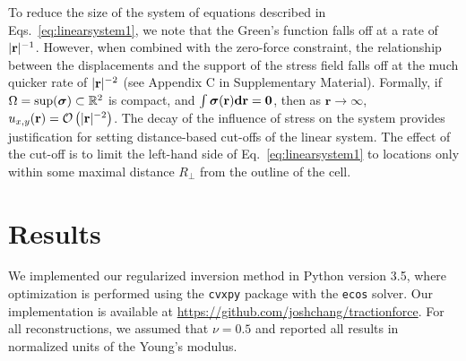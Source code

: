 \documentclass[aps,prl,reprint,groupedaddress,twocolumn]{revtex4-1}
\newcommand{\bsigma}{{\boldsymbol\sigma}}
\def\d{{\bf d}}
\def\r{{\bf r}}
\begin{document}
To reduce the size of the system of equations described in
Eqs.~\ref{eq:linearsystem1}, we note that the Green's function falls
off at a rate of $|\r|^{-1}$. However, when combined with the
zero-force constraint, the relationship between the
displacements and the support of the stress field falls off at the
much quicker rate of $|\r|^{-2}$ (see Appendix C in Supplementary Material). Formally, if 
%
%
$\Omega = {\rm sup}(\bsigma)\subset \mathbb{R}^2$ is compact, and
$\int \bsigma(\r)\d\r = \mathbf{0}$, then as $\mathbf{r}\to\infty$,
$u_{x,y}(\r) = \mathcal{O}\left( |\r|^{-2} \right)$.  The decay of the
influence of stress on the system provides justification for setting
distance-based cut-offs of the linear system. The effect of the
cut-off is to limit the left-hand side of Eq.~\ref{eq:linearsystem1}
to locations only within some maximal distance $R_{\perp}$ from the
outline of the cell.


\section{Results}

We implemented our regularized inversion method in Python version 3.5,
where optimization is performed using the \texttt{cvxpy} package with
the \texttt{ecos} solver.  Our implementation is available at
\url{https://github.com/joshchang/tractionforce}.  For all reconstructions,
we assumed that $\nu=0.5$ and reported all results in normalized
units of the Young's modulus.
\end{document}
